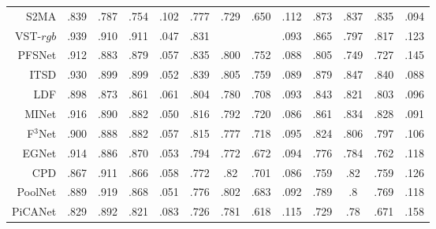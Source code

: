 \begin{table}[p]
{\begin{tabular}{rcccccccccccc}
			S2MA    \upcite{liu2020learning} 
			& .839 & .787 & .754 & 	.102 
			& .777 & .729 & .650 & .112 
			& .873 & .837 &	.835 & .094 \\
			
			
			
			
			VST-$rgb$ \upcite{liu2021visual} 
			& .939 & .910 & .911 & .047
			& .831 & \dashuline{.808} & \dashuline{.763} & .093 
			& .865 & .797 & .817 & .123 
			\\ 
			
			PFSNet \upcite{ma2021pyramidal}
			& .912 & .883 & .879 & .057 
			& .835 & .800 & .752 & .088 
			& .805 & .749 & .727 & .145 
			\\ 
			
			
			ITSD \upcite{zhou2020interactive} 
			& .930 & .899 & .899 & .052 
			& .839 & .805 & .759 & .089 
			& .879 & .847 & .840 & .088 
			\\ 
			
			
			
			LDF \upcite{wei2020label} 
			& .898 & .873 & .861 & .061 
			& .804 & .780 & .708 & .093 
			& .843 & .821 & .803 & .096 
			\\ 
			
			
			MINet \upcite{pang2020multi} 
			& .916 & .890 & .882 & .050 
			& .816 & .792 & .720 & .086 
			& .861 & .834 & .828 & .091 
			\\ 
			
			F$^{3}$Net  \upcite{wei2020f3net}
			& .900 & .888 & .882 & .057 
			& .815 & .777 & .718 & .095 
			& .824 & .806 & .797 & .106 
			\\ 
			
			
			EGNet   \upcite{zhao2019egnet}
			& .914 & .886 & .870 & .053 
			& .794 & .772 & .672 & .094 
			& .776 & .784 & .762 & .118 
			\\ 
			
			CPD  \upcite{wu2019cascaded}
			& .867 & .911 & .866 & .058 
			& .772 & .82  & .701 & .086 
			& .759 & .82  & .759 & .126 \\
			
			PoolNet \upcite{liu2019simple}
			& .889 & .919 & .868 & .051 
			& .776 & .802 & .683 & .092 
			& .789 & .8   & .769 & .118 \\
			
			PiCANet \upcite{liu2018picanet}
			& .829 & .892 & .821 & .083 
			& .726 & .781 & .618 & .115 
			& .729 & .78  & .671 & .158 \\
			

\end{tabular}}
\end{table}
